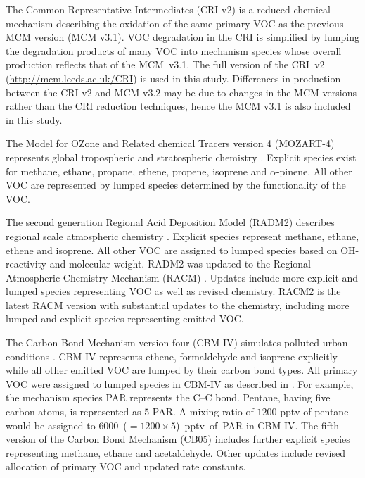 The Common Representative Intermediates (CRI v2) \citep{Jenkin:2008} is a reduced chemical mechanism describing the oxidation of the same primary VOC as the previous MCM version (MCM v3.1). 
VOC degradation in the CRI is simplified by lumping the degradation products of many VOC into mechanism species whose overall  production reflects that of the \mbox{MCM v3.1}. 
The full version of the \mbox{CRI v2} (\url{http://mcm.leeds.ac.uk/CRI}) is used in this study.
Differences in  production between the CRI v2 and MCM v3.2 may be due to changes in the MCM versions rather than the CRI reduction techniques, hence the MCM v3.1 is also included in this study.

The Model for OZone and Related chemical Tracers version 4 (MOZART-4) represents global tropospheric and stratospheric chemistry \citep{Emmons:2010}. 
Explicit species exist for methane, ethane, propane, ethene, propene, isoprene and $\alpha$-pinene.
All other VOC are represented by lumped species determined by the functionality of the VOC.

The second generation Regional Acid Deposition Model (RADM2) describes regional scale atmospheric chemistry \citep{Stockwell:1990}. 
Explicit species represent methane, ethane, ethene and isoprene. 
All other VOC are assigned to lumped species based on OH-reactivity and molecular weight.
RADM2 was updated to the Regional Atmospheric Chemistry Mechanism (RACM) \citep{Stockwell:1997}. 
Updates include more explicit and lumped species representing VOC as well as revised chemistry.
RACM2 is the latest RACM version \citep{Goliff:2013} with substantial updates to the chemistry, including more lumped and explicit species representing emitted VOC.

The Carbon Bond Mechanism version four (CBM-IV) simulates polluted urban conditions \citep{Gery:1989}. 
CBM-IV represents ethene, formaldehyde and isoprene explicitly while all other emitted VOC are lumped by their carbon bond types. 
All primary VOC were assigned to lumped species in CBM-IV as described in \citet{Hogo:1989}. 
For example, the mechanism species PAR represents the C--C bond.
Pentane, having five carbon atoms, is represented as $5$ PAR.
A mixing ratio of $1200$ pptv of pentane would be assigned to \mbox{$6000$ ($= 1200 \times 5$) pptv of PAR} in CBM-IV.
The fifth version of the Carbon Bond Mechanism (CB05) \citep{Yarwood:2005} includes further explicit species representing methane, ethane and acetaldehyde. 
Other updates include revised allocation of primary VOC and updated rate constants.
%
